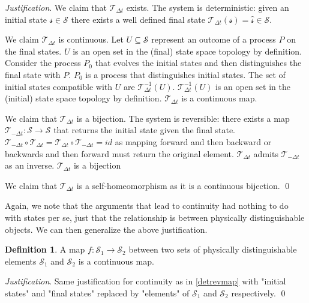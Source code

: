 \documentclass[aps,pra,10pt,twocolumn,floatfix,nofootinbib]{revtex4-1}
\theoremstyle{definition}
\newtheorem{defn}[prop]{Definition}
\newenvironment{justification}{\emph{Justification}.}{\qed}
\begin{document}
\begin{justification}
We claim that $\mathcal{T}_{\Delta t}$ exists. The system is deterministic: given an initial state $\mathcal{s} \in \mathcal{S}$ there exists a well defined final state $\mathcal{T}_{\Delta t}(\mathcal{s})=\hat{\mathcal{s}} \in \mathcal{S}$.

We claim $\mathcal{T}_{\Delta t}$ is continuous. Let $U \subseteq \mathcal{S}$ represent an outcome of a process $P$ on the final states. $U$ is an open set in the (final) state space topology by definition. Consider the process $P_0$ that evolves the initial states and then distinguishes the final state with $P$. $P_0$ is a process that distinguishes initial states. The set of initial states compatible with $U$ are $\mathcal{T}_{\Delta t}^{-1}(U)$. $\mathcal{T}_{\Delta t}^{-1}(U)$ is an open set in the (initial) state space topology by definition. $\mathcal{T}_{\Delta t}$ is a continuous map.

We claim that $\mathcal{T}_{\Delta t}$ is a bijection. The system is reversible: there exists a map $\mathcal{T}_{-\Delta t}:\mathcal{S} \rightarrow \mathcal{S}$ that returns the initial state given the final state. $\mathcal{T}_{-\Delta t} \circ \mathcal{T}_{\Delta t} = \mathcal{T}_{\Delta t} \circ \mathcal{T}_{-\Delta t} = id$ as mapping forward and then backward or backwards and then forward must return the original element. $\mathcal{T}_{\Delta t}$ admits $\mathcal{T}_{-\Delta t}$ as an inverse. $\mathcal{T}_{\Delta t}$ is a bijection

We claim that $\mathcal{T}_{\Delta t}$ is a self-homeomorphism as it is a continuous bijection.
\end{justification}

Again, we note that the arguments that lead to continuity had nothing to do with states per se, just that the relationship is between physically distinguishable objects. We can then generalize the above justification.

\begin{defn}\label{continuous_map}
	A map $f:\mathcal{S_1} \rightarrow \mathcal{S_2}$ between two sets of physically distinguishable elements $\mathcal{S_1}$ and $\mathcal{S_2}$ is a continuous map.
\end{defn}

\begin{justification}
	Same justification for continuity as in \ref{detrevmap} with "initial states" and "final states" replaced by "elements" of $\mathcal{S_1}$ and $\mathcal{S_2}$ respectively.
\end{justification}
\end{document}
